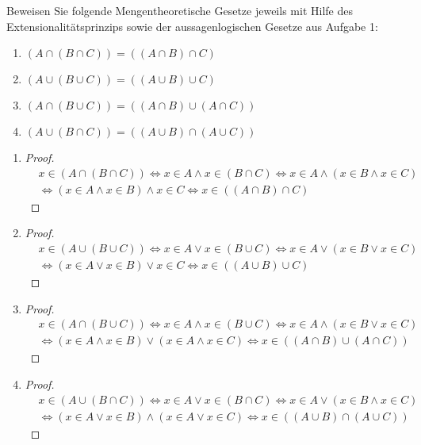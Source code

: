 \documentclass[12pt]{exam}
\begin{document}
\begin{questions}

Beweisen Sie folgende Mengentheoretische Gesetze jeweils mit Hilfe des Extensionalitätsprinzips sowie der aussagenlogischen Gesetze aus Aufgabe 1:
\begin{enumerate}
	\item $(A\cap(B\cap C))=((A\cap B)\cap C)$
	\item $(A\cup(B\cup C))=((A\cup B)\cup C)$
	\item $(A\cap(B\cup C))=((A\cap B)\cup(A\cap C))$
	\item $(A\cup(B\cap C))=((A\cup B)\cap(A\cup C))$
\end{enumerate}
\begin{solution}
	\begin{enumerate}
		\item \begin{proof}\begin{align*}
			&x\in(A\cap(B\cap C))\Leftrightarrow x\in A \land x\in (B\cap C) \Leftrightarrow x\in A \land (x\in B \land x\in C)\\
			&\Leftrightarrow(x\in A \land x\in B) \land x\in C \Leftrightarrow x\in((A\cap B)\cap C)
		\end{align*}\end{proof}
		\item \begin{proof}\begin{align*}
			&x\in(A\cup(B\cup C))\Leftrightarrow x\in A \lor x\in (B\cup C) \Leftrightarrow x\in A \lor (x\in B \lor x\in C)\\
			&\Leftrightarrow(x\in A \lor x\in B) \lor x\in C \Leftrightarrow x\in((A\cup B)\cup C)
		\end{align*}\end{proof}
		\item \begin{proof}\begin{align*}
			&x\in(A\cap(B\cup C))\Leftrightarrow x\in A \land x\in (B\cup C) \Leftrightarrow x\in A \land (x\in B \lor x\in C)\\
			&\Leftrightarrow(x\in A \land x\in B) \lor(x\in A \land x\in C) \Leftrightarrow x\in((A\cap B)\cup(A\cap C))
		\end{align*}\end{proof}
		\item \begin{proof}\begin{align*}
			&x\in(A\cup(B\cap C))\Leftrightarrow x\in A \lor x\in (B\cap C) \Leftrightarrow x\in A \lor (x\in B \land x\in C)\\
			&\Leftrightarrow(x\in A \lor x\in B) \land(x\in A \lor x\in C) \Leftrightarrow x\in((A\cup B)\cap(A\cup C))
		\end{align*}\end{proof}
	\end{enumerate}
\end{solution}




\end{questions}
\end{document}
